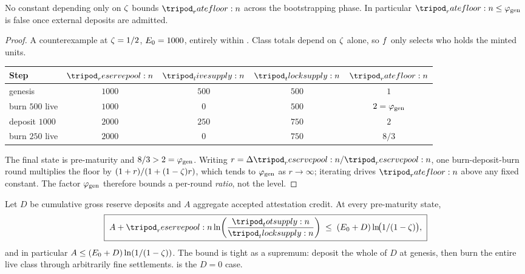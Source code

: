 \documentclass[../main.tex]{subfiles}
\begin{document}
\begin{proposition}
    \label{prop:containment:no-fixed-bootstrap-floor-ceiling}
    No constant depending only on $\zeta$ bounds $\ratefloor{}$ across the
    bootstrapping phase. In particular $\ratefloor{} \leq \genesisfloorfactor$ is false once
    external deposits are admitted.
\end{proposition}
\begin{proof}
    A counterexample at $\zeta = 1/2$, $E\sb{0} = 1000$, entirely within
    . Class totals depend on $\zeta$ alone, so
    $f$ only selects who holds the minted units.
    \begin{center}
    \begin{tabular}{@{}l c c c c@{}}
        \toprule
        \textbf{Step} & $\reservepool{}$ & $\livesupply{}$ & $\tlocksupply{}$ & $\ratefloor{}$ \\
        \midrule
        genesis            & $1000$ & $500$ & $500$ & $1$ \\
        burn $500$ live    & $1000$ & $0$   & $500$ & $2 = \varphi\sb{\mathrm{gen}}$ \\
        deposit $1000$     & $2000$ & $250$ & $750$ & $2$ \\
        burn $250$ live    & $2000$ & $0$   & $750$ & $8/3$ \\
        \bottomrule
    \end{tabular}
    \end{center}
    The final state is pre-maturity and $8/3 > 2 = \varphi\sb{\mathrm{gen}}$. Writing
    $r = \Delta\reservepool{}/\reservepool{}$, one burn-deposit-burn round multiplies the
    floor by $(1+r)/(1+(1-\zeta)r)$, which tends to $\varphi\sb{\mathrm{gen}}$ as
    $r \to \infty$; iterating drives $\ratefloor{}$ above any fixed constant. The factor
    $\varphi\sb{\mathrm{gen}}$ therefore bounds a per-round \emph{ratio}, not the level.
\end{proof}

\begin{theorem}
    \label{thm:containment:pre-maturity-deposit-capacity}
    Let $D$ be cumulative gross reserve deposits and $A$ aggregate accepted attestation
    credit. At every pre-maturity state,
    \begin{equation}
        \KEY{\;
        A + \reservepool{}\ln\!\left(\frac{\totsupply{}}{\tlocksupply{}}\right)
        \;\leq\; (\genesisreserve + D)\ln\!\bigl(1/(1-\livesplit)\bigr),
        \;}
        \label{eq:containment:pre-maturity-deposit-capacity}
    \end{equation}
    and in particular
    $A \leq (E\sb{0} + D)\ln(1/(1-\zeta))$. The bound is tight as a supremum:
    deposit the whole of $D$ at genesis, then burn the entire live class through
    arbitrarily fine settlements.  is the $D = 0$
    case.
\end{theorem}
\end{document}
